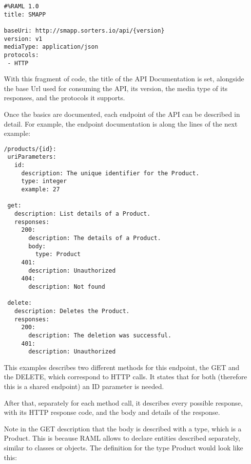 \begin{verbatim}
#%RAML 1.0
title: SMAPP

baseUri: http://smapp.sorters.io/api/{version}
version: v1
mediaType: application/json
protocols:
 - HTTP
\end{verbatim}

With this fragment of code, the title of the API Documentation is set, alongside the base Url used for consuming the API, its version, the media type of its responses, and the protocols it supports.

Once the basics are documented, each endpoint of the API can be described in detail. For example, the  endpoint documentation is along the lines of the next example:

\begin{verbatim}
/products/{id}:
 uriParameters:
   id:
     description: The unique identifier for the Product.
     type: integer
     example: 27

 get:
   description: List details of a Product.
   responses:
     200:
       description: The details of a Product.
       body:
         type: Product
     401:
       description: Unauthorized
     404:
       description: Not found

 delete:
   description: Deletes the Product.
   responses:
     200:
       description: The deletion was successful.
     401:
       description: Unauthorized
\end{verbatim}

This examples describes two different methods for this endpoint, the GET and the DELETE, which correspond to HTTP calls. It states that for both (therefore this is a shared endpoint) an ID parameter is needed.

After that, separately for each method call, it describes every possible response, with its HTTP response code, and the body and details of the response.

Note in the GET description that the body is described with a type, which is a Product. This is because RAML allows to declare entities described separately, similar to classes or objects. The definition for the type Product would look like this:

